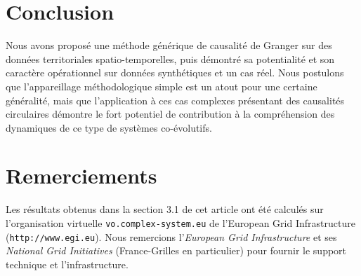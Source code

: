 \documentclass[english]{./sageo}
\begin{document}
\section{Conclusion}

Nous avons proposé une méthode générique de causalité de Granger sur des données territoriales spatio-temporelles, puis démontré sa potentialité et son caractère opérationnel sur données synthétiques et un cas réel. Nous postulons que l'appareillage méthodologique simple est un atout pour une certaine généralité, mais que l'application à ces cas complexes présentant des causalités circulaires démontre le fort potentiel de contribution à la compréhension des dynamiques de ce type de systèmes co-évolutifs.



\section*{Remerciements}

Les résultats obtenus dans la section 3.1 de cet article ont été calculés sur l'organisation virtuelle \texttt{vo.complex-system.eu} de l'European Grid Infrastructure (\texttt{http://www.egi.eu}). Nous remercions l'\textit{European Grid Infrastructure} et ses \textit{National Grid Initiatives} (France-Grilles en particulier) pour fournir le support technique et l'infrastructure.



\end{document}
